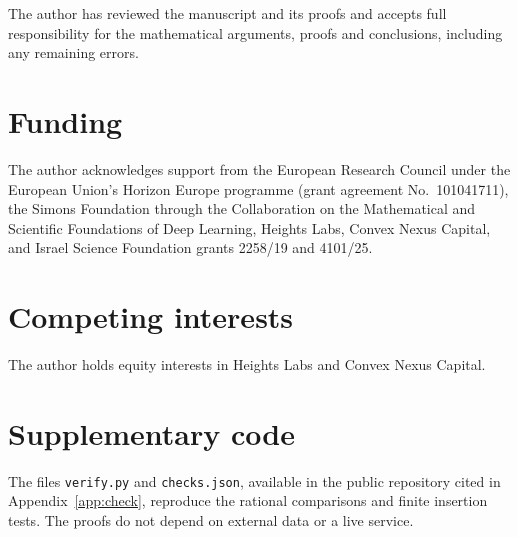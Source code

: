 \documentclass[11pt,reqno]{amsart}
\numberwithin{equation}{section}
\theoremstyle{plain}
\theoremstyle{definition}
\newcommand{\1}{\mathbf 1}
\begin{document}
The author has reviewed the manuscript and its proofs and accepts full responsibility for the mathematical arguments, proofs and conclusions, including any remaining errors.

\section*{Funding}
The author acknowledges support from the European Research Council under the European Union's Horizon Europe programme (grant agreement No.~101041711), the Simons Foundation through the Collaboration on the Mathematical and Scientific Foundations of Deep Learning, Heights Labs, Convex Nexus Capital, and Israel Science Foundation grants 2258/19 and 4101/25.

\section*{Competing interests}
The author holds equity interests in Heights Labs and Convex Nexus Capital.
\section*{Supplementary code}
The files \texttt{verify.py} and \texttt{checks.json}, available in the public repository cited in Appendix~\ref{app:check}, reproduce the rational comparisons and finite insertion tests. The proofs do not depend on external data or a live service.
\end{document}
